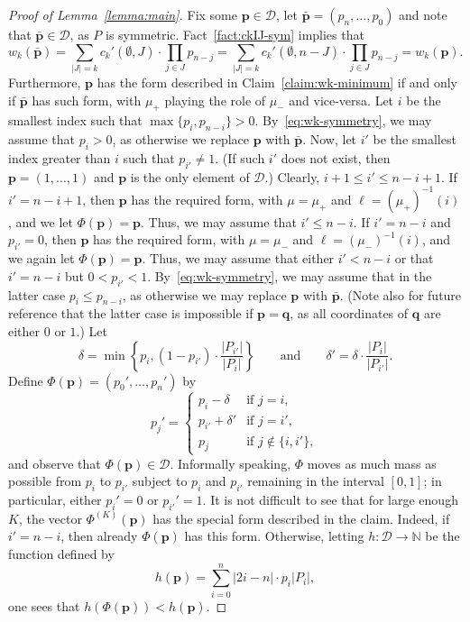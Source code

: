 \documentclass[11pt,a4paper,reqno]{amsart}
\numberwithin{claim}{thm}
\theoremstyle{definition}
\newcommand{\bp}{\mathbf{p}}
\newcommand{\bpr}{\bar{\mathbf{p}}}
\newcommand{\bq}{\mathbf{q}}
\newcommand{\cD}{\mathcal{D}}
\newcommand{\Nat}{\mathbb{N}}
\newcommand{\mum}{\mu_-}
\newcommand{\mup}{\mu_+}
\renewcommand{\le}{\leqslant}
\begin{document}
\begin{proof}[{Proof of Lemma~\ref{lemma:main}}]
  Fix some $\bp \in \cD$, let $\bpr = (p_n, \dotsc, p_0)$ and note that $\bpr \in \cD$, as $P$ is symmetric. Fact~\ref{fact:ckIJ-sym} implies that
  \begin{equation}
    \label{eq:wk-symmetry}
    w_k(\bpr) = \sum_{|J| = k} c_k'(\emptyset, J) \cdot \prod_{j \in J} p_{n-j} = \sum_{|J| = k} c_k'(\emptyset ,n-J) \cdot \prod_{j \in J} p_{n-j} = w_k(\bp).    
  \end{equation}
  Furthermore, $\bp$ has the form described in Claim~\ref{claim:wk-minimum} if and only if $\bpr$ has such form, with $\mup$ playing the role of $\mum$ and vice-versa. Let $i$ be the smallest index such that $\max\{p_i, p_{n-i}\} > 0$. By~\eqref{eq:wk-symmetry}, we may assume that $p_i > 0$, as otherwise we replace $\bp$ with $\bpr$. Now, let $i'$ be the smallest index greater than $i$ such that $p_{i'} \neq 1$. (If such $i'$ does not exist, then $\bp = (1, \dotsc, 1)$ and $\bp$ is the only element of $\cD$.) Clearly, $i+1 \le i' \le n-i+1$. If $i' = n-i+1$, then $\bp$ has the required form, with $\mu = \mup$ and $\ell = (\mup)^{-1}(i)$, and we let $\Phi(\bp) = \bp$. Thus, we may assume that $i' \le n-i$. If $i' = n-i$ and $p_{i'} = 0$, then $\bp$ has the required form, with $\mu = \mum$ and $\ell = (\mum)^{-1}(i)$, and we again let $\Phi(\bp) = \bp$. Thus, we may assume that either $i' < n-i$ or that $i' = n-i$ but $0 < p_{i'} < 1$. By~\eqref{eq:wk-symmetry}, we may assume that in the latter case $p_i \le p_{n-i}$, as otherwise we may replace $\bp$ with $\bpr$. (Note also for future reference that the latter case is impossible if $\bp = \bq$, as all coordinates of $\bq$ are either $0$ or $1$.) Let
  \[
    \delta = \min\left\{ p_i, (1-p_{i'}) \cdot \frac{|P_{i'}|}{|P_i|}\right\} \qquad \text{and} \qquad \delta' = \delta \cdot \frac{|P_i|}{|P_{i'}|}.
  \]
  Define $\Phi(\bp) = (p_0', \dotsc, p_n')$ by
  \[
    p_j' =
    \begin{cases}
      p_i - \delta & \text{if $j = i$}, \\
      p_{i'} + \delta' & \text{if $j = i'$}, \\
      p_j & \text{if $j \not\in \{i, i'\}$},
    \end{cases}
  \]
  and observe that $\Phi(\bp) \in \cD$. Informally speaking, $\Phi$ moves as much mass as possible from $p_i$ to $p_{i'}$ subject to $p_i$ and $p_{i'}$ remaining in the interval $[0,1]$; in particular, either $p_i' = 0$ or $p_{i'}' = 1$. It is not difficult to see that for large enough $K$, the vector $\Phi^{(K)}(\bp)$ has the special form described in the claim. Indeed, if $i' = n-i$, then already $\Phi(\bp)$ has this form. Otherwise, letting $h \colon \cD \to \Nat$ be the function defined by 
  \[
    h(\bp) = \sum_{i=0}^n |2i - n| \cdot p_i |P_i|,
  \]
  one sees that $h(\Phi(\bp)) < h(\bp)$.


\end{proof}
\end{document}
